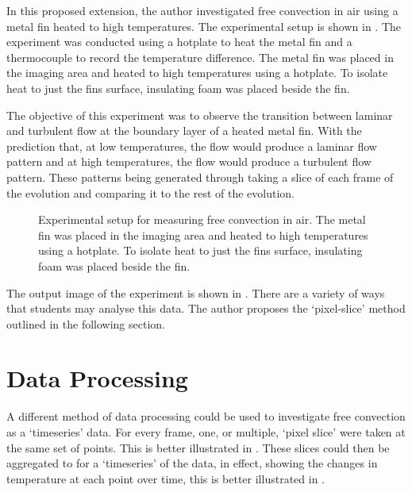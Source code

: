 \documentclass[aip, cp, amsmath, amssymb, reprint, nofootinbib]{revtex4-2}
\begin{document}
        In this proposed extension, the author investigated free convection in air using a metal fin heated to high temperatures. The experimental setup is shown in . The experiment was conducted using a hotplate to heat the metal fin and a thermocouple \cite{fluke} to record the temperature difference. The metal fin was placed in the imaging area and heated to high temperatures using a hotplate. To isolate heat to just the fins surface, insulating foam was placed beside the fin.

        The objective of this experiment was to observe the transition between laminar and turbulent flow at the boundary layer of a heated metal fin. With the prediction that, at low temperatures, the flow would produce a laminar flow pattern and at high temperatures, the flow would produce a turbulent flow pattern. These patterns being generated through taking a slice of each frame of the evolution and comparing it to the rest of the evolution.


        \begin{figure}[H]
            \centering
            \scalebox{0.7}{}
            \caption{Experimental setup for measuring free convection in air. The metal fin was placed in the imaging area and heated to high temperatures using a hotplate. To isolate heat to just the fins surface, insulating foam was placed beside the fin.}
            \label{fig:freeconvectionfin}
        \end{figure}

        The output image of the experiment is shown in . There are a variety of ways that students may analyse this data. The author proposes the `pixel-slice' method outlined in the following section.


    \section{Data Processing}
        A different method of data processing could be used to investigate free convection as a `timeseries' data. For every frame, one, or multiple, `pixel slice' were taken at the same set of points. This is better illustrated in . These slices could then be aggregated to for a `timeseries' of the data, in effect, showing the changes in temperature at each point over time, this is better illustrated in .
\end{document}
